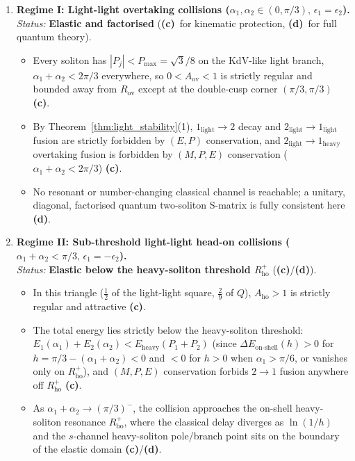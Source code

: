 \documentclass[11pt,a4paper]{article}
\newcommand{\Lc}{\textsf{\textbf{(c)}}\xspace}
\newcommand{\Ld}{\textsf{\textbf{(d)}}\xspace}
\theoremstyle{remark}
\begin{document}
\begin{enumerate}
\item \textbf{Regime I: Light-light overtaking collisions ($\alpha_1,\alpha_2\in(0,\pi/3),\,\epsilon_1=\epsilon_2$).}\\
\emph{Status:} \textbf{Elastic and factorised} (\Lc\ for kinematic protection, \Ld\ for full quantum theory).
\begin{itemize}
\item Every soliton has $|P_j| < P_{\max} = \sqrt{3}/8$ on the KdV-like light
branch, $\alpha_1+\alpha_2 < 2\pi/3$ everywhere, so $0 < A_{\mathrm{ov}} < 1$ is
strictly regular and bounded away from $R_{\mathrm{ov}}$ except at the double-cusp
corner $(\pi/3,\pi/3)$ \Lc.
\item By Theorem~\ref{thm:light_stability}(1), $1_{\mathrm{light}}\to 2$ decay and
$2_{\mathrm{light}}\to 1_{\mathrm{light}}$ fusion are strictly forbidden by
$(E,P)$ conservation, and $2_{\mathrm{light}}\to 1_{\mathrm{heavy}}$ overtaking
fusion is forbidden by $(M,P,E)$ conservation ($\alpha_1+\alpha_2 < 2\pi/3$) \Lc.
\item No resonant or number-changing classical channel is reachable; a unitary,
diagonal, factorised quantum two-soliton S-matrix is fully consistent here \Ld.
\end{itemize}

\item \textbf{Regime II: Sub-threshold light-light head-on collisions ($\alpha_1+\alpha_2 < \pi/3,\,\epsilon_1=-\epsilon_2$).}\\
\emph{Status:} \textbf{Elastic below the heavy-soliton threshold $R_{\mathrm{ho}}^+$} (\Lc/\Ld).
\begin{itemize}
\item In this triangle ($\frac{1}{2}$ of the light-light square, $\frac{2}{9}$
of $Q$), $A_{\mathrm{ho}} > 1$ is strictly regular and attractive \Lc.
\item The total energy lies strictly below the heavy-soliton threshold:
$E_1(\alpha_1) + E_2(\alpha_2) < E_{\mathrm{heavy}}(P_1+P_2)$ (since
$\Delta E_{\mathrm{on\text{-}shell}}(h) > 0$ for $h=\pi/3-(\alpha_1+\alpha_2)<0$
and $<0$ for $h>0$ when $\alpha_1>\pi/6$, or vanishes only on $R_{\mathrm{ho}}^+$),
and $(M,P,E)$ conservation forbids $2\to 1$ fusion anywhere off $R_{\mathrm{ho}}^+$ \Lc.
\item As $\alpha_1+\alpha_2 \to (\pi/3)^-$, the collision approaches the
on-shell heavy-soliton resonance $R_{\mathrm{ho}}^+$, where the classical delay
diverges as $\ln(1/h)$ and the $s$-channel heavy-soliton pole/branch point sits
on the boundary of the elastic domain \Lc/\Ld.
\end{itemize}


\end{enumerate}
\end{document}
